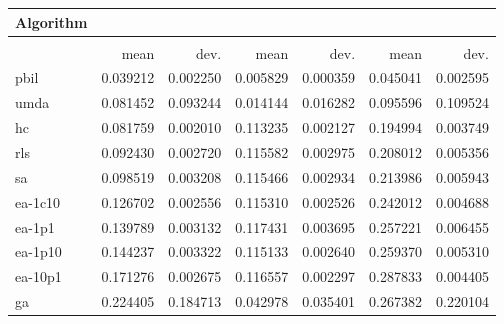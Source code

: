 \begin{tabular}{@{} l *{6}{>{{}}N{1}{2}} @{}}
\toprule
{Algorithm} &  \\
\midrule
&  &  &  \\
\midrule
& {mean} & {dev.} & {mean} & {dev.} & {mean} & {dev.} \\
\midrule
pbil & 0.039212 & 0.002250 & 0.005829 & 0.000359 & 0.045041 & 0.002595 \\
umda & 0.081452 & 0.093244 & 0.014144 & 0.016282 & 0.095596 & 0.109524 \\
hc & 0.081759 & 0.002010 & 0.113235 & 0.002127 & 0.194994 & 0.003749 \\
rls & 0.092430 & 0.002720 & 0.115582 & 0.002975 & 0.208012 & 0.005356 \\
sa & 0.098519 & 0.003208 & 0.115466 & 0.002934 & 0.213986 & 0.005943 \\
ea-1c10 & 0.126702 & 0.002556 & 0.115310 & 0.002526 & 0.242012 & 0.004688 \\
ea-1p1 & 0.139789 & 0.003132 & 0.117431 & 0.003695 & 0.257221 & 0.006455 \\
ea-1p10 & 0.144237 & 0.003322 & 0.115133 & 0.002640 & 0.259370 & 0.005310 \\
ea-10p1 & 0.171276 & 0.002675 & 0.116557 & 0.002297 & 0.287833 & 0.004405 \\
ga & 0.224405 & 0.184713 & 0.042978 & 0.035401 & 0.267382 & 0.220104 \\
\bottomrule
\end{tabular}

